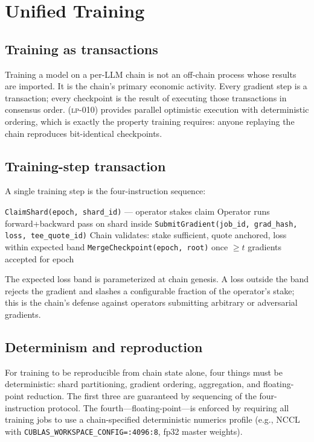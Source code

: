 \section{Unified Training}
\label{sec:training}

\subsection{Training as transactions}

Training a model on a per-LLM chain is not an off-chain process whose results are imported. It is the chain's primary economic activity. Every gradient step is a transaction; every checkpoint is the result of executing those transactions in consensus order. \BlockSTM{} (\textsc{lp-010}) provides parallel optimistic execution with deterministic ordering, which is exactly the property training requires: anyone replaying the chain reproduces bit-identical checkpoints.

\subsection{Training-step transaction}

A single training step is the four-instruction sequence:

\begin{algorithm}[h]
\caption{Per-Step Training Cycle}
\begin{algorithmic}[1]
\STATE \texttt{ClaimShard(epoch, shard\_id)} --- operator stakes claim
\STATE Operator runs forward+backward pass on shard inside \TEE{}
\STATE \texttt{SubmitGradient(job\_id, grad\_hash, loss, tee\_quote\_id)}
\STATE Chain validates: stake sufficient, \TEE{} quote anchored, loss within expected band
\STATE \texttt{MergeCheckpoint(epoch, root)} once $\ge t$ gradients accepted for epoch
\end{algorithmic}
\end{algorithm}

The expected loss band is parameterized at chain genesis. A loss outside the band rejects the gradient and slashes a configurable fraction of the operator's stake; this is the chain's defense against operators submitting arbitrary or adversarial gradients.

\subsection{Determinism and reproduction}

For training to be reproducible from chain state alone, four things must be deterministic: shard partitioning, gradient ordering, aggregation, and floating-point reduction. The first three are guaranteed by \BlockSTM{} sequencing of the four-instruction protocol. The fourth---floating-point---is enforced by requiring all training jobs to use a chain-specified deterministic numerics profile (e.g., NCCL with \texttt{CUBLAS\_WORKSPACE\_CONFIG=:4096:8}, fp32 master weights).

